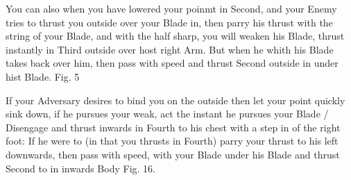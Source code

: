 \newpage


\newpage

\exercise{}


You can also when you have lowered your poinmt in Second, and your
Enemy tries to thrust you outside over your Blade in, then parry his
thrust with the string of your Blade, and with the half
sharp, you will weaken
his Blade, thrust instantly in Third outside over host right Arm. But
when he whith his Blade takes back over him, then pass with speed and
thrust Second outside in under hist Blade. Fig. 5



If your Adversary desires to bind you on the outside then let your
point quickly sink down, if he pursues your weak, act the instant he
pursues your Blade / Disengage and thrust inwards in Fourth to his
chest with a step in of the right foot: If he were to (in that you
thrusts in Fourth) parry your thrust to his left downwards, then pass
with speed, with your Blade under his Blade and thrust Second to in
inwards Body Fig. 16.






